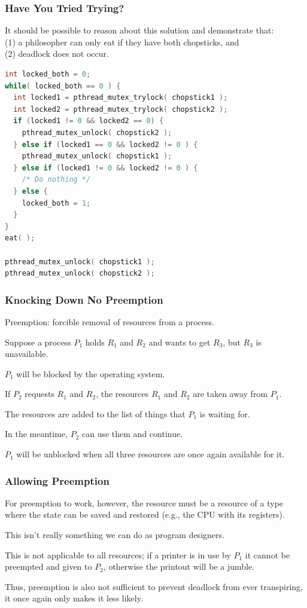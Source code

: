 \begin{frame}[fragile]
\frametitle{Have You Tried Trying?}

It should be possible to reason about this solution and demonstrate that:\\
\quad (1) a philosopher can only eat if they have both chopsticks, and\\
\quad (2) deadlock does not occur.

\begin{lstlisting}[language=C]
int locked_both = 0;
while( locked_both == 0 ) {
  int locked1 = pthread_mutex_trylock( chopstick1 );
  int locked2 = pthread_mutex_trylock( chopstick2 );
  if (locked1 != 0 && locked2 == 0) {
    pthread_mutex_unlock( chopstick2 );
  } else if (locked1 == 0 && locked2 != 0 ) {
    pthread_mutex_unlock( chopstick1 );
  } else if (locked1 != 0 && locked2 != 0 ) {
    /* Do nothing */
  } else {
    locked_both = 1;
  }
}
eat( );

pthread_mutex_unlock( chopstick1 );
pthread_mutex_unlock( chopstick2 );
\end{lstlisting}

\end{frame}



\begin{frame}
\frametitle{Knocking Down No Preemption}

Preemption: forcible removal of resources from a process.

Suppose a process $P_{1}$ holds $R_{1}$ and $R_{2}$ and wants to get $R_{3}$, but $R_{3}$ is unavailable. 

$P_{1}$ will be blocked by the operating system. 

If $P_{2}$ requests $R_{1}$ and $R_{2}$, the resources $R_{1}$ and $R_{2}$ are taken away from $P_{1}$.

The resources are added to the list of things that $P_{1}$ is waiting for.

In the meantime, $P_{2}$ can use them and continue. 

$P_{1}$ will be unblocked when all three resources are once again available for it.

\end{frame}


\begin{frame}
\frametitle{Allowing Preemption}

For preemption to work, however, the resource must be a resource of a type where the state can be saved and restored (e.g., the CPU with its registers). 

This isn't really something we can do as program designers.

This is not applicable to all resources; if a printer is in use by $P_{1}$ it cannot be preempted and given to $P_{2}$, otherwise the printout will be a jumble. 

Thus, preemption is also not sufficient to prevent deadlock from ever transpiring, it once again only makes it less likely.



\end{frame}





